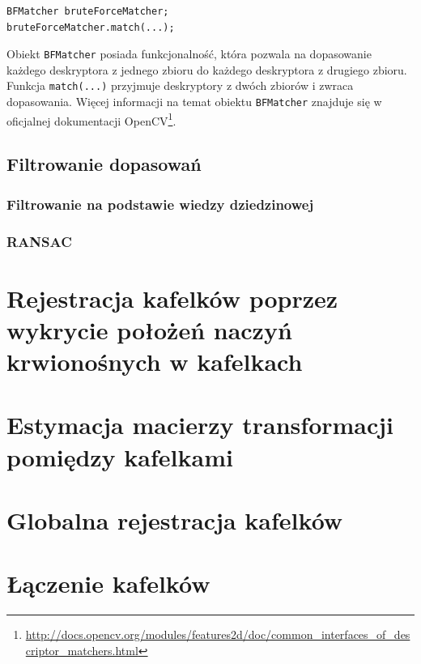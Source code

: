 \begin{verbatim}
BFMatcher bruteForceMatcher;
bruteForceMatcher.match(...);
\end{verbatim}

Obiekt \texttt{BFMatcher} posiada funkcjonalność, która pozwala na dopasowanie każdego deskryptora z jednego zbioru do każdego deskryptora z drugiego zbioru. Funkcja \texttt{match(...)} przyjmuje deskryptory z dwóch zbiorów i zwraca dopasowania. Więcej informacji na temat obiektu \texttt{BFMatcher} znajduje się w oficjalnej dokumentacji OpenCV\footnote{\url{http://docs.opencv.org/modules/features2d/doc/common_interfaces_of_descriptor_matchers.html}}.

\subsection{Filtrowanie dopasowań}
\label{sec:proponowane_algorytmy:filtrowanie}

\subsubsection{Filtrowanie na podstawie wiedzy dziedzinowej}
\label{sec:proponowane_algorytmy:filtrowanie_dziedzinowe}

\subsubsection{RANSAC}
\label{sec:proponowane_algorytmy:ransac}

\section{Rejestracja kafelków poprzez wykrycie położeń naczyń krwionośnych w kafelkach}
\label{sec:proponowane_algorytmy:depth_first_search}

\section{Estymacja macierzy transformacji pomiędzy kafelkami}
\label{sec:proponowane_algorytmy:estymacja}

\section{Globalna rejestracja kafelków}
\label{sec:proponowane_algorytmy:globalna_rejestracja}

\section{Łączenie kafelków}
\label{sec:proponowane_algorytmy:laczenie_kafelkow}
